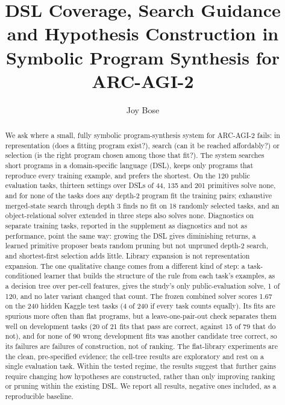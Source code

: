 \documentclass[sigconf,nonacm]{acmart}
\begin{document}
\title{DSL Coverage, Search Guidance and Hypothesis Construction in Symbolic Program Synthesis for ARC-AGI-2}

\author{Joy Bose}

\begin{abstract}
We ask where a small, fully symbolic program-synthesis system for ARC-AGI-2 fails: in representation (does a fitting program exist?), search (can it be reached affordably?) or selection (is the right program chosen among those that fit?). The system searches short programs in a domain-specific language (DSL), keeps only programs that reproduce every training example, and prefers the shortest. On the 120 public evaluation tasks, thirteen settings over DSLs of 44, 135 and 201 primitives solve none, and for none of the tasks does any depth-2 program fit the training pairs; exhaustive merged-state search through depth 3 finds no fit on 18 randomly selected tasks, and an object-relational solver extended in three steps also solves none. Diagnostics on separate training tasks, reported in the supplement as diagnostics and not as performance, point the same way: growing the DSL gives diminishing returns, a learned primitive proposer beats random pruning but not unpruned depth-2 search, and shortest-first selection adds little. Library expansion is not representation expansion. The one qualitative change comes from a different kind of step: a task-conditioned learner that builds the structure of the rule from each task's examples, as a decision tree over per-cell features, gives the study's only public-evaluation solve, 1 of 120, and no later variant changed that count. The frozen combined solver scores 1.67 on the 240 hidden Kaggle test tasks (4 of 240 if every task counts equally). Its fits are spurious more often than flat programs, but a leave-one-pair-out check separates them well on development tasks (20 of 21 fits that pass are correct, against 15 of 79 that do not), and for none of 90 wrong development fits was another candidate tree correct, so its failures are failures of construction, not of ranking. The flat-library experiments are the clean, pre-specified evidence; the cell-tree results are exploratory and rest on a single evaluation task. Within the tested regime, the results suggest that further gains require changing how hypotheses are constructed, rather than only improving ranking or pruning within the existing DSL. We report all results, negative ones included, as a reproducible baseline.
\end{abstract}
\end{document}
